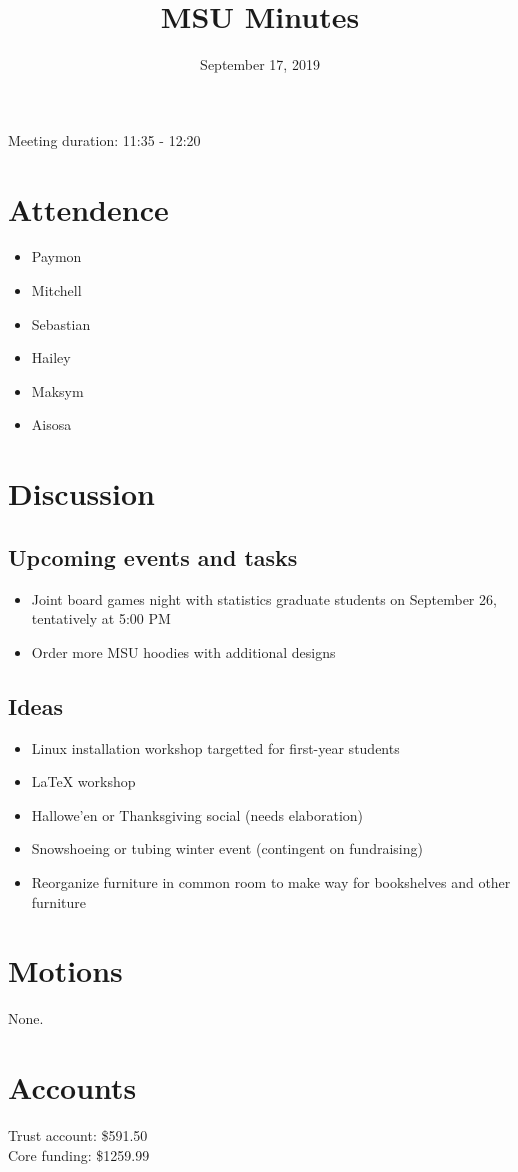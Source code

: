 \documentclass[12pt]{article}
\title{MSU Minutes}
\date{September 17, 2019}
\begin{document}
\maketitle

Meeting duration: 11:35 - 12:20

\section*{Attendence}
\begin{itemize}
\item Paymon
\item Mitchell
\item Sebastian
\item Hailey
\item Maksym
\item Aisosa
\end{itemize}

\section*{Discussion}
\subsection*{Upcoming events and tasks}
\begin{itemize}
\item Joint board games night with statistics graduate students on September 26, tentatively at 5:00 PM
\item Order more MSU hoodies with additional designs
\end{itemize}
\subsection*{Ideas}
\begin{itemize}
  \item Linux installation workshop targetted for first-year students
  \item LaTeX workshop
  \item Hallowe'en or Thanksgiving social (needs elaboration)
  \item Snowshoeing or tubing winter event (contingent on fundraising)
  \item Reorganize furniture in common room to make way for bookshelves and other furniture
\end{itemize}

\section*{Motions}

None.

\section*{Accounts}

Trust account: \$591.50 \\
Core funding: \$1259.99 \\
\end{document}

